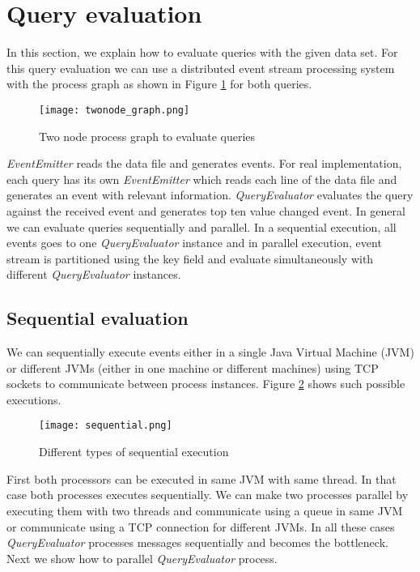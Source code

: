 \section{Query evaluation}

In this section, we explain how to evaluate queries with the given data set. For this query evaluation we can use a distributed event stream processing system with the process graph as shown in Figure \ref{twonode_graph} for both queries.

\begin{figure}[!t]
        \centering
        \texttt{[image: twonode\_graph.png]}
        \caption{Two node process graph to evaluate queries}
        \label{twonode_graph}
\end{figure}

\textit{EventEmitter} reads the data file and generates events. For real implementation, each query has its own \textit{EventEmitter} which reads each line of the data file and generates an event with relevant information. \textit{QueryEvaluator} evaluates the query against the received event and generates top ten value changed event.  In general we can evaluate queries sequentially and parallel. In a sequential execution, all events goes to one \textit{QueryEvaluator} instance and in parallel execution, event stream is partitioned using the key field and evaluate simultaneously with different \textit{QueryEvaluator} instances.

\subsection{Sequential evaluation}

We can sequentially execute events either in a single Java Virtual Machine (JVM) or different JVMs (either in one machine or different machines) using TCP sockets to communicate between process instances. Figure \ref{sequential} shows such possible executions. 

\begin{figure}[!t]
        \centering
        \texttt{[image: sequential.png]}
        \caption{Different types of sequential execution}
        \label{sequential}
\end{figure}

First both processors can be executed in same JVM with same thread. In that case both processes executes sequentially. We can make two processes parallel by executing them with two threads and communicate using a queue in same JVM or communicate using a TCP connection for different JVMs. In all these cases \textit{QueryEvaluator} processes messages sequentially and becomes the bottleneck. Next we show how to parallel \textit{QueryEvaluator} process. 

